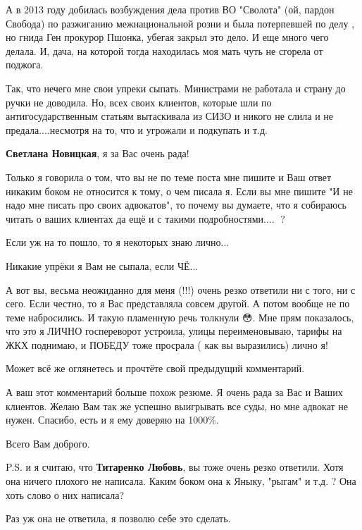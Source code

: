 \begin{itemize}
\begin{itemize}
А в 2013 году добилась возбуждения дела против ВО "Сволота" (ой, пардон
Свобода) по разжиганию межнациональной розни и была потерпевшей по делу , но
гнида Ген прокурор Пшонка, убегая закрыл это дело. И еще много чего делала. И,
дача, на которой тогда находилась моя мать чуть не сгорела от поджога. 

Так, что нечего мне свои упреки сыпать. Министрами не работала и страну до
ручки не доводила. Но, всех своих клиентов, которые шли по антигосударственным
статьям вытаскивала из СИЗО и никого не слила и не предала....несмотря на то,
что и угрожали и подкупать и т.д.

 
\textbf{Светлана Новицкая}, я за Вас очень рада!

Только я говорила о том, что вы не по теме поста мне пишите и Ваш ответ никаким
боком не относится к тому, о чем писала я. Если вы мне пишите "И не надо мне
писать про своих адвокатов", то почему вы думаете, что я собираюсь читать о
ваших клиентах да ещё и с такими подробностями.... 🤔?

Если уж на то пошло, то я некоторых знаю лично...

Никакие упрёки я Вам не сыпала, если ЧЁ...

А вот вы, весьма неожиданно для меня (!!!) очень резко ответили ни с того, ни с
сего. Если честно, то я Вас представляла совсем другой. А потом вообще не по
теме набросились. И такую пламенную речь толкнули 😳. Мне прям показалось, что
это я ЛИЧНО госпереворот устроила, улицы переименовываю, тарифы на ЖКХ
поднимаю, и ПОБЕДУ тоже просрала ( как вы выразились) лично я!

Может всё же оглянетесь и прочтёте свой предыдущий комментарий.

А ваш этот комментарий больше похож резюме. Я очень рада за Вас и Ваших
клиентов. Желаю Вам так же успешно выигрывать все суды, но мне адвокат не
нужен. Спасибо, есть и я ему доверяю на 1000\%.

Всего Вам доброго.

P.S. и я считаю, что \textbf{Титаренко Любовь}, вы тоже очень резко ответили. Хотя она
ничего плохого не написала. Каким боком она к Яныку, "рыгам" и т.д. ? Она хоть
слово о них написала?

Раз уж она не ответила, я позволю себе это сделать.


\end{itemize}
\end{itemize}
